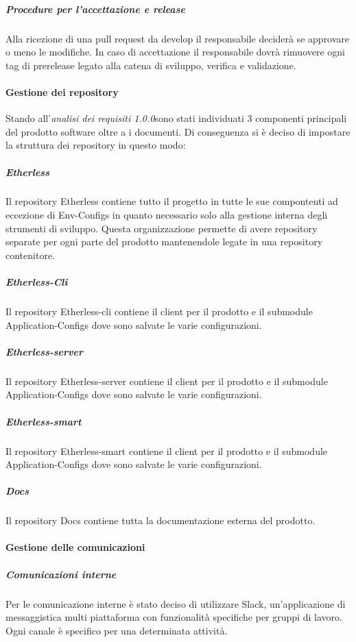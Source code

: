 				\subparagraph{Procedure per l'accettazione e release}
				Alla ricezione di una pull request da develop il responsabile deciderà se
				approvare o meno le modifiche.
				In caso di accettazione il responsabile dovrà rimuovere ogni tag di prerelease
				legato alla catena di sviluppo, verifica e validazione.

				\paragraph{Gestione dei repository}
				Stando all'\textit{analisi dei requisiti 1.0.0}\doc sono stati individuati
				3 componenti principali del prodotto software oltre a i documenti.
				Di conseguenza si è deciso di impostare la struttura dei repository in questo modo:


				\subparagraph{Etherless}
				Il repository Etherless contiene tutto il progetto in tutte le sue compontenti
				ad eccezione di Env-Configs in quanto necessario solo alla gestione interna
				degli strumenti di sviluppo.
				Questa organizzazione permette di avere repository separate per ogni parte
				del prodotto mantenendole legate in una repository contenitore.

				\subparagraph{Etherless-Cli}
				Il repository Etherless-cli contiene il client per il prodotto e il submodule
				Application-Configs dove sono salvate le varie configurazioni.

				\subparagraph{Etherless-server}
				Il repository Etherless-server contiene il client per il prodotto e il submodule
				Application-Configs dove sono salvate le varie configurazioni.

				\subparagraph{Etherless-smart}
				Il repository Etherless-smart contiene il client per il prodotto e il submodule
				Application-Configs dove sono salvate le varie configurazioni.

				\subparagraph{Docs}
				Il repository Docs contiene tutta la documentazione esterna del prodotto.



   			\paragraph{Gestione delle comunicazioni}
   				\subparagraph{Comunicazioni interne}
   					Per le comunicazione interne è stato deciso di utilizzare  Slack\glos, un'applicazione di messaggistica multi piattaforma con funzionalità specifiche per gruppi di lavoro. Ogni canale è specifico per una determinata attività.

